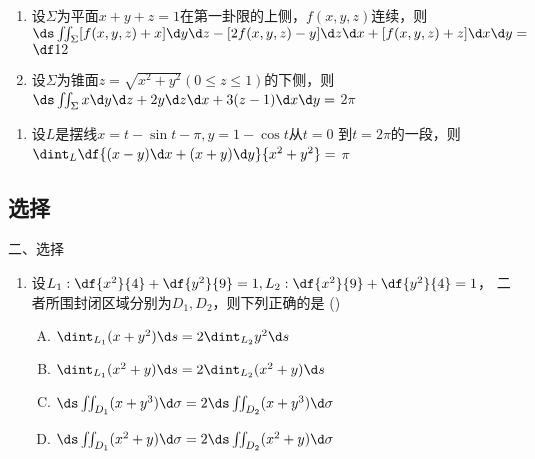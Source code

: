 \begin{frame}
	\linespread{2}
		\begin{enumerate}
		  \addtocounter{enumi}{3}
		  \item 设$\Sigma$为平面$x+y+z=1$在第一卦限的上侧，$f(x,y,z)$连续，则
		  $\ds\iint_{\Sigma}[f(x,y,z)+x]\d y\d z-[2f(x,y,z)-y]\d z\d x+
		  [f(x,y,z)+z]\d x\d y=$\pause
		  \underline{\quad\alert{$\df 12$}\quad}\pause
		  \item 设$\Sigma$为锥面$z=\sqrt{x^2+y^2}(0\leq z\leq 1)$的下侧，则
		  $\ds\iint_{\Sigma}x\d y\d z+2y\d z\d x+3(z-1)\d x\d y=$\pause
		  \underline{\quad\alert{$2\pi$}\quad}
		\end{enumerate}
\end{frame}

\begin{frame}
	\linespread{2}
		\begin{enumerate}
		  \addtocounter{enumi}{5}
		  \item 设$L$是摆线$x=t-\sin t-\pi,y=1-\cos t$从$t=0$
		  到$t=2\pi$的一段，则$\dint_L\df{(x-y)\d x+(x+y)\d y}{x^2+y^2}=$\pause
		  \underline{\quad\alert{$\pi$}\quad}
		\end{enumerate}
\end{frame}

\subsection{选择}

\begin{frame}{二、选择}
	\linespread{2}
		\begin{enumerate}
		  \addtocounter{enumi}{6}
		  \item
		  设$L_1:\df{x^2}{4}+\df{y^2}{9}=1,L_2:\df{x^2}{9}+\df{y^2}{4}=1$，
		  二者所围封闭区域分别为$D_1,D_2$，则下列正确的是\;
		  ({\;\uncover<2->{\alert{C}}\;})
		  \begin{enumerate}[(A)]
		    \item $\dint_{L_1}(x+y^2)\d s=2\dint_{L_2}y^2\d s$
		    \item $\dint_{L_1}(x^2+y)\d s=2\dint_{L_2}(x^2+y)\d s$
		    \item $\ds\iint_{D_1}(x+y^3)\d\sigma=2\ds\iint_{D_2}(x+y^3)\d\sigma$
		    \item $\ds\iint_{D_1}(x^2+y)\d\sigma=2\ds\iint_{D_2}(x^2+y)\d\sigma$
		  \end{enumerate}
		\end{enumerate}
\end{frame}

